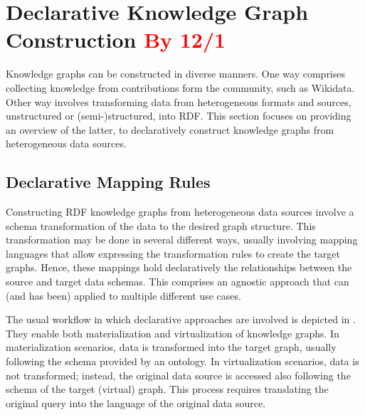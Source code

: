 \section{Declarative Knowledge Graph Construction \textcolor{red}{By 12/1}}
\label{sec:chp2_declarative_kgc}

Knowledge graphs can be constructed in diverse manners. One way comprises collecting knowledge from contributions form the community, such as Wikidata. Other way involves transforming data from heterogeneous formats and sources, unstructured or (semi-)structured, into RDF. This section focuses on providing an overview of the latter, to declaratively construct knowledge graphs from heterogeneous data sources. 





\subsection{Declarative Mapping Rules}

Constructing RDF knowledge graphs from heterogeneous data sources involve a schema transformation of the data to the desired graph structure. This transformation may be done in several different ways, usually involving mapping languages that allow expressing the transformation rules to create the target graphs. Hence, these mappings hold declaratively the relationships between the source and target data schemas. This comprises an agnostic approach that can (and has been) applied to multiple different use cases. 

The usual workflow in which declarative approaches are involved is depicted in . They enable both materialization and virtualization of knowledge graphs. In materialization scenarios, data is transformed into the target graph, usually following the schema provided by an ontology. In virtualization scenarios, data is not transformed; instead, the original data source is accessed also following the schema of the target (virtual) graph. This process requires translating the original query into the language of the original data source. 

